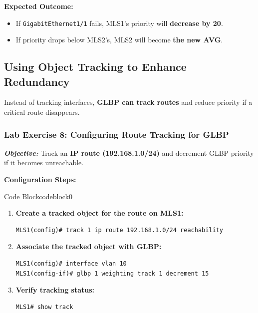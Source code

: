 \documentclass[a4paper]{book}
\begin{document}
\textbf{Expected Outcome:}
\begin{itemize}
\item If \texttt{GigabitEthernet1/1} fails, MLS1’s priority will \textbf{decrease by 20}.
\item If priority drops below MLS2’s, MLS2 will become \textbf{the new AVG}.
\end{itemize}

\subsection{Using Object Tracking to Enhance Redundancy}
Instead of tracking interfaces, \textbf{GLBP can track routes} and reduce priority if a 
critical route disappears.

\subsubsection{Lab Exercise 8: Configuring Route Tracking for GLBP}
\textbf{\textit{Objective:}} Track an \textbf{IP route (192.168.1.0/24)} and decrement GLBP 
priority if it becomes unreachable.
\vspace{1.5em}

\textbf{Configuration Steps:}

\vspace{1.5em}


\begin{ocg}{Code Block}{codeblock}{0}

\vspace{0.5cm}


\begin{enumerate}
\item \textbf{Create a tracked object for the route on MLS1:}
\begin{lstlisting}
MLS1(config)# track 1 ip route 192.168.1.0/24 reachability
\end{lstlisting}

\item \textbf{Associate the tracked object with GLBP:}
\begin{lstlisting}
MLS1(config)# interface vlan 10
MLS1(config-if)# glbp 1 weighting track 1 decrement 15
\end{lstlisting}

\item \textbf{Verify tracking status:}
\begin{lstlisting}
MLS1# show track
\end{lstlisting}
\end{enumerate}
\end{ocg}
\end{document}
